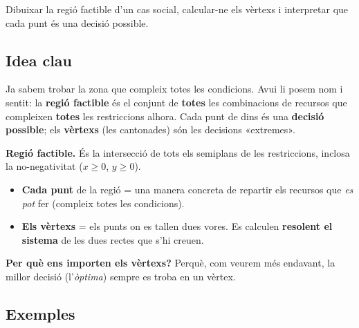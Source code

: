 %
{Dibuixar la regió factible d'un cas social, calcular-ne els vèrtexs i interpretar que cada punt és una decisió possible.}

\subsection{Idea clau}

Ja sabem trobar la zona que compleix totes les condicions. Avui li posem nom i sentit:
la \textbf{regió factible} és el conjunt de \textbf{totes} les combinacions de
recursos que compleixen \textbf{totes} les restriccions alhora. Cada punt de dins és
una \textbf{decisió possible}; els \textbf{vèrtexs} (les cantonades) són les decisions
«extremes».

\begin{idea}
\textbf{Regió factible.} És la intersecció de tots els semiplans de les restriccions,
inclosa la no-negativitat ($x\ge 0$, $y\ge 0$).
\begin{itemize}[leftmargin=1.4em, itemsep=2pt]
  \item \textbf{Cada punt} de la regió = una manera concreta de repartir els recursos
        que \emph{es pot} fer (compleix totes les condicions).
  \item \textbf{Els vèrtexs} = els punts on es tallen dues vores. Es calculen
        \textbf{resolent el sistema} de les dues rectes que s'hi creuen.
\end{itemize}
\textbf{Per què ens importen els vèrtexs?} Perquè, com veurem més endavant, la millor
decisió (l'\emph{òptima}) sempre es troba en un vèrtex.
\end{idea}

\subsection{Exemples}

